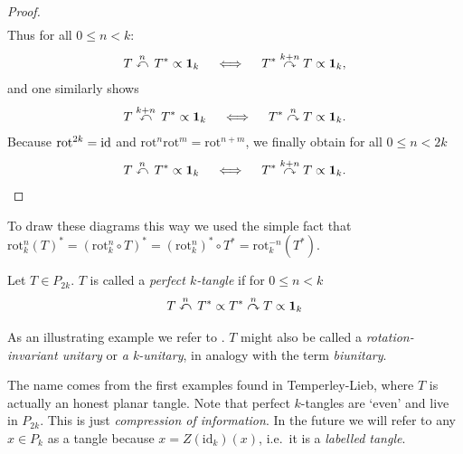 \begin{proposition}
\begin{proof}
\begin{align*}
\end{align*}
Thus for all $0\leq n < k$:
\begin{align*}
T\stackrel{n}{\curvearrowleft}\,T^* \propto \mathbf{1}_k \quad \iff\quad T^*  \stackrel{k+n}{\curvearrowright} T\propto \mathbf{1}_k,
\end{align*}
and one similarly shows
\begin{align*}
T\stackrel{k+n}{\curvearrowleft}\,T^* \propto \mathbf{1}_k \quad \iff\quad T^*  \stackrel{n}{\curvearrowright} T\propto \mathbf{1}_k.
\end{align*}
Because $\mathrm{rot}^{2k} = \operatorname{id}$ and $\mathrm{rot}^n\mathrm{rot}^m = \mathrm{rot}^{n+m}$, we finally obtain for all $0\leq n< 2k$
\begin{align*}
T\stackrel{n}{\curvearrowleft}\,T^* \propto \mathbf{1}_k \quad \iff\quad T^*  \stackrel{k+n}{\curvearrowright} T\propto \mathbf{1}_k.
\end{align*}
\end{proof}
\end{proposition}
To draw these diagrams this way we used the simple fact that $ \mathrm{rot}_k^n(T) ^* = \left(\mathrm{rot}_k^n\circ T\right)^*= \left(\mathrm{rot}_k^n\right)^*\circ T^*=\mathrm{rot}_k^{-n}\left( T^* \right)$.

\begin{definition}\label{def:Perfect Tangle}
Let $T\in P_{2k}$. $T$ is called a \emph{perfect $k$-tangle} if for $0\leq n < k$
\begin{align*}
T \stackrel{n}{\curvearrowleft}\, T^* \propto T^* \stackrel{n}{\curvearrowright} T \propto \mathbf{1}_k
\end{align*}

As an illustrating example we refer to . $T$ might also be called a \emph{rotation-invariant unitary} or \emph{a k-unitary}, in analogy with the term \emph{biunitary}.
\end{definition}
The name comes from the first examples found in Temperley-Lieb, where $T$ is actually an honest planar tangle. Note that perfect $k$-tangles are `even' and live in $P_{2k}$. This is just \emph{compression of information}.
In the future we will refer to any $x\in P_k$ as a tangle because $x=Z(\mathrm{id}_k)(x)$, i.e.\ it is a \emph{labelled tangle}.

